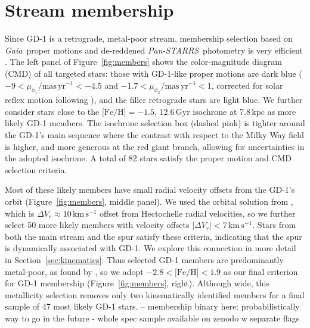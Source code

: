 \documentclass[twocolumn]{aastex63}
\newcommand{\gaia}{\textsl{Gaia}}
\newcommand{\pans}{\textsl{Pan-STARRS}}
\newcommand{\kms}{\ensuremath{\textrm{km}\,\textrm{s}^{-1}}}
\newcommand{\masyr}{\ensuremath{\textrm{mas}\,\textrm{yr}^{-1}}}
\newcommand{\feh}{\ensuremath{\textrm{[Fe/H]}}}
\begin{document}
\section{Stream membership}
\label{sec:membership}

Since GD-1 is a retrograde, metal-poor stream, membership selection based on \gaia\ proper motions \citep{gdr2} and de-reddened \pans\ photometry \citep{sfd, ps1} is very efficient \citep[e.g.,][]{pwb}.
The left panel of Figure~\ref{fig:members} shows the color-magnitude diagram (CMD) of all targeted stars: those with GD-1-like proper motions are dark blue ($-9<\mu_{\phi_1}/\masyr<-4.5$ and $-1.7<\mu_{\phi_2}/\masyr<1$, corrected for solar reflex motion following \citealt{pwb}), and the filler retrograde stars are light blue.
We further consider stars close to the $\textrm{[Fe/H]}=-1.5$, 12.6\,Gyr isochrone at 7.8\,kpc \citep{choi2016} as more likely GD-1 members.
The isochrone selection box (dashed pink) is tighter around the GD-1's main sequence where the contrast with respect to the Milky Way field is higher, and more generous at the red giant branch, allowing for uncertainties in the adopted isochrone.
A total of 82 stars satisfy the proper motion and CMD selection criteria.

Most of these likely members have small radial velocity offsets from the GD-1's orbit (Figure~\ref{fig:members}, middle panel).
We used the orbital solution from \citet{pwb}, which is $\Delta V_r\approx10\,\kms$ offset from Hectochelle radial velocities, so we further select 50 more likely members with velocity offsets $|\Delta V_r| < 7\,\kms$.
Stars from both the main stream and the spur satisfy these criteria, indicating that the spur is dynamically associated with GD-1.
We explore this connection in more detail in Section~\ref{sec:kinematics}.
% 
Thus selected GD-1 members are predominantly metal-poor, as found by \citet{malhan2019}, so we adopt $-2.8<\feh<1.9$ as our final criterion for GD-1 membership (Figure~\ref{fig:members}, right).
Although wide, this metallicity selection removes only two kinematically identified members for a final sample of 47 most likely GD-1 stars.
-- membership binary here: probabilistically way to go in the future
- whole spec sample available on zenodo w separate flags
\end{document}
